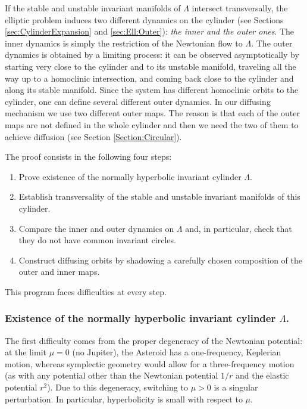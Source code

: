 If the stable and unstable invariant manifolds of $\Lambda$ intersect
transversally, the elliptic problem induces two different dynamics
on the cylinder (see Sections \ref{sec:CylinderExpansion}
and \ref{sec:Ell:Outer}): {\it the inner and the outer ones}.  The
inner dynamics is simply the restriction of the Newtonian flow to
$\Lambda$.  The outer dynamics is obtained by a limiting process: it
can be observed asymptotically by starting very close to the
cylinder and to its unstable manifold, traveling all the way up to
a homoclinic intersection, and coming back close to the cylinder and
along its stable manifold. Since the system has different homoclinic
orbits to the cylinder, one can define several different outer dynamics.
In our diffusing mechanism we use two different outer maps. The reason
is that each of the outer maps are not defined in the whole cylinder
and then we need the two of them to achieve diffusion (see Section \ref{Section:Circular}).

The proof consists in the following four steps:
\begin{enumerate}
\item Prove existence of the normally hyperbolic invariant
  cylinder $\Lambda$.
\item Establish transversality of the stable and unstable
  invariant manifolds of this cylinder.
\item Compare the inner and outer dynamics on $\Lambda$ and,  in
  particular,  check that they do not have common invariant circles.
\item Construct diffusing orbits by shadowing a carefully chosen
  composition of the outer and inner maps.
\end{enumerate}
This program faces difficulties at every step.

\subsubsection{Existence of the normally hyperbolic invariant cylinder $\Lambda$.}
The first difficulty comes
from the proper degeneracy of the Newtonian potential: at the limit
$\mu=0$ (no Jupiter), the Asteroid has a one-frequency, Keplerian
motion, whereas symplectic geometry would allow for a three-frequency
motion (as with any potential other than the Newtonian potential $1/r$
and the elastic potential $r^2$). Due to this degeneracy, switching to
$\mu>0$ is a singular perturbation. In particular, hyperbolicity is
small with respect to $\mu$.

